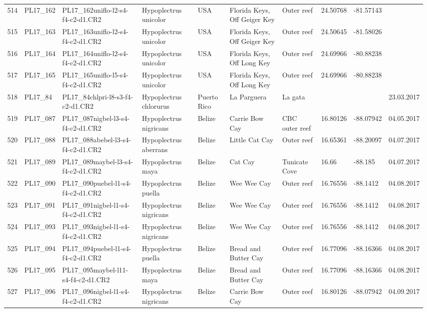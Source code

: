 \begin{table}[ht]
\begin{tabular}{rlllllllll}
  514 & PL17\_162 & PL17\_162uniflo-l2-s4-f4-c2-d1.CR2 & Hypoplectrus unicolor & USA & Florida Keys, Off Geiger Key & Outer reef & 24.50768 & -81.57143 &  \\ 
  515 & PL17\_163 & PL17\_163uniflo-l2-s4-f4-c2-d1.CR2 & Hypoplectrus unicolor & USA & Florida Keys, Off Geiger Key & Outer reef & 24.50645 & -81.58026 &  \\ 
  516 & PL17\_164 & PL17\_164uniflo-l2-s4-f4-c2-d1.CR2 & Hypoplectrus unicolor & USA & Florida Keys, Off Long Key & Outer reef & 24.69966 & -80.88238 &  \\ 
  517 & PL17\_165 & PL17\_165uniflo-l5-s4-f4-c2-d1.CR2 & Hypoplectrus unicolor & USA & Florida Keys, Off Long Key & Outer reef & 24.69966 & -80.88238 &  \\ 
  518 & PL17\_84 & PL17\_84chlpri-l8-s3-f4-c2-d1.CR2 & Hypoplectrus chlorurus & Puerto Rico & La Parguera & La gata &  &  & 23.03.2017 \\ 
  519 & PL17\_087 & PL17\_087nigbel-l3-s4-f4-c2-d1.CR2 & Hypoplectrus nigricans & Belize & Carrie Bow Cay & CBC outer reef & 16.80126 & -88.07942 & 04.05.2017 \\ 
  520 & PL17\_088 & PL17\_088abebel-l3-s4-f4-c2-d1.CR2 & Hypoplectrus aberrans & Belize & Little Cat Cay & Outer reef & 16.65361 & -88.20097 & 04.07.2017 \\ 
  521 & PL17\_089 & PL17\_089maybel-l3-s4-f4-c2-d1.CR2 & Hypoplectrus maya & Belize & Cat Cay & Tunicate Cove & 16.66 & -88.185 & 04.07.2017 \\ 
  522 & PL17\_090 & PL17\_090puebel-l1-s4-f4-c2-d1.CR2 & Hypoplectrus puella & Belize & Wee Wee Cay & Outer reef & 16.76556 & -88.1412 & 04.08.2017 \\ 
  523 & PL17\_091 & PL17\_091nigbel-l1-s4-f4-c2-d1.CR2 & Hypoplectrus nigricans & Belize & Wee Wee Cay & Outer reef & 16.76556 & -88.1412 & 04.08.2017 \\ 
  524 & PL17\_093 & PL17\_093nigbel-l1-s4-f4-c2-d1.CR2 & Hypoplectrus nigricans & Belize & Wee Wee Cay & Outer reef & 16.76556 & -88.1412 & 04.08.2017 \\ 
  525 & PL17\_094 & PL17\_094puebel-l1-s4-f4-c2-d1.CR2 & Hypoplectrus puella & Belize & Bread and Butter Cay & Outer reef & 16.77096 & -88.16366 & 04.08.2017 \\ 
  526 & PL17\_095 & PL17\_095maybel-l11-s4-f4-c2-d1.CR2 & Hypoplectrus maya & Belize & Bread and Butter Cay & Outer reef & 16.77096 & -88.16366 & 04.08.2017 \\ 
  527 & PL17\_096 & PL17\_096nigbel-l1-s4-f4-c2-d1.CR2 & Hypoplectrus nigricans & Belize & Carrie Bow Cay & Outer reef & 16.80126 & -88.07942 & 04.09.2017 \\ 

\end{tabular}
\end{table}
